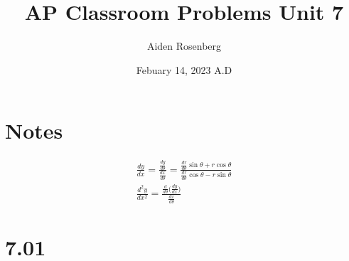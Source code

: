 \documentclass[12pt]{article}
\title{AP Classroom Problems Unit 7}
\author{Aiden Rosenberg}
\date{Febuary 14, 2023 A.D}
\begin{document}
\maketitle
\section*{Notes}
\begin{align}
	\frac{dy}{dx}= \frac{\frac{dy}{d\theta}}{\frac{dx}{d\theta}} = \frac{\frac{dr}{d\theta}\sin \theta +r\cos \theta}{\frac{dr}{d\theta}\cos \theta - r\sin \theta} \\
	\frac{d^2y}{dx^2} = \frac{\frac{d}{d\theta}\big(\frac{dy}{dx}\big)}{\frac{dx}{d\theta}}                                                                         
\end{align}
\section*{7.01}
\end{document}
